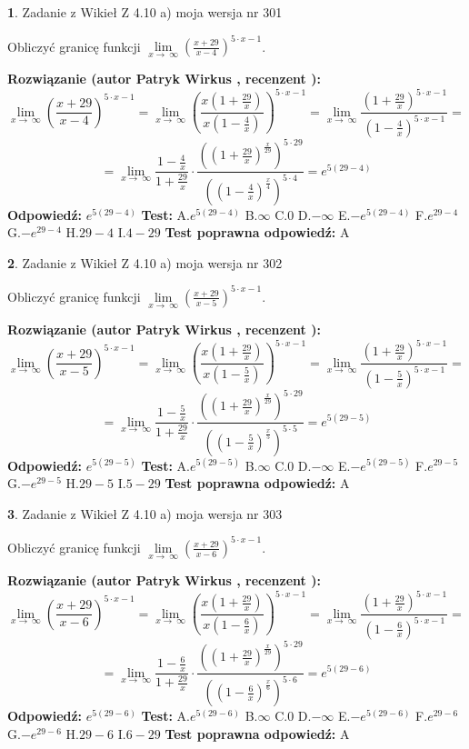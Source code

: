 \documentclass[12pt, a4paper]{article}
\theoremstyle{definition} %
\newtheorem{zad}{}
\newcommand{\zadStart}[1]{\begin{zad}#1\newline}
\newcommand{\zadStop}{\end{zad}}
\newcommand{\rozwStart}[2]{\noindent \textbf{Rozwiązanie (autor #1 , recenzent #2): }\newline}
\newcommand{\rozwStop}{\newline}
\newcommand{\odpStart}{\noindent \textbf{Odpowiedź:}\newline}
\newcommand{\odpStop}{\newline}
\newcommand{\testStart}{\noindent \textbf{Test:}\newline}
\newcommand{\testStop}{\newline}
\newcommand{\kluczStart}{\noindent \textbf{Test poprawna odpowiedź:}\newline}
\newcommand{\kluczStop}{\newline}
\begin{document}
\zadStart{Zadanie z Wikieł Z 4.10 a) moja wersja nr 301}


Obliczyć granicę funkcji  $\lim\limits_{x\to\ \infty}(\frac{x+29}{x-4})^{5\cdot x-1}$.
\zadStop
\rozwStart{Patryk Wirkus}{}
$$\lim\limits_{x\to\ \infty}(\frac{x+29}{x-4})^{5\cdot x-1} = \lim\limits_{x\to\ \infty}(\frac{x(1+\frac{29}{x})}{x(1-\frac{4}{x})})^{5\cdot x-1}=\lim\limits_{x\to\ \infty}\frac{(1+\frac{29}{x})^{5\cdot x-1}}{(1-\frac{4}{x})^{5\cdot x-1}}=$$
$$=\lim\limits_{x\to\ \infty}\frac{1-\frac{4}{x}}{1+\frac{29}{x}}\cdot\frac{((1+\frac{29}{x})^{\frac{x}{29}})^{5\cdot29}}{((1-\frac{4}{x})^{\frac{x}{4}})^{5\cdot4}}=e^{5(29-4)}$$
\rozwStop
\odpStart
$e^{5(29-4)}$
\odpStop
\testStart
A.$e^{5(29-4)}$ B.$\infty$ C.$0$ D.$-\infty$ E.$-e^{5(29-4)}$
F.$e^{29-4}$ G.$-e^{29-4}$
H.$29-4$
I.$4-29$
\testStop
\kluczStart
A
\kluczStop



\zadStart{Zadanie z Wikieł Z 4.10 a) moja wersja nr 302}


Obliczyć granicę funkcji  $\lim\limits_{x\to\ \infty}(\frac{x+29}{x-5})^{5\cdot x-1}$.
\zadStop
\rozwStart{Patryk Wirkus}{}
$$\lim\limits_{x\to\ \infty}(\frac{x+29}{x-5})^{5\cdot x-1} = \lim\limits_{x\to\ \infty}(\frac{x(1+\frac{29}{x})}{x(1-\frac{5}{x})})^{5\cdot x-1}=\lim\limits_{x\to\ \infty}\frac{(1+\frac{29}{x})^{5\cdot x-1}}{(1-\frac{5}{x})^{5\cdot x-1}}=$$
$$=\lim\limits_{x\to\ \infty}\frac{1-\frac{5}{x}}{1+\frac{29}{x}}\cdot\frac{((1+\frac{29}{x})^{\frac{x}{29}})^{5\cdot29}}{((1-\frac{5}{x})^{\frac{x}{5}})^{5\cdot5}}=e^{5(29-5)}$$
\rozwStop
\odpStart
$e^{5(29-5)}$
\odpStop
\testStart
A.$e^{5(29-5)}$ B.$\infty$ C.$0$ D.$-\infty$ E.$-e^{5(29-5)}$
F.$e^{29-5}$ G.$-e^{29-5}$
H.$29-5$
I.$5-29$
\testStop
\kluczStart
A
\kluczStop



\zadStart{Zadanie z Wikieł Z 4.10 a) moja wersja nr 303}


Obliczyć granicę funkcji  $\lim\limits_{x\to\ \infty}(\frac{x+29}{x-6})^{5\cdot x-1}$.
\zadStop
\rozwStart{Patryk Wirkus}{}
$$\lim\limits_{x\to\ \infty}(\frac{x+29}{x-6})^{5\cdot x-1} = \lim\limits_{x\to\ \infty}(\frac{x(1+\frac{29}{x})}{x(1-\frac{6}{x})})^{5\cdot x-1}=\lim\limits_{x\to\ \infty}\frac{(1+\frac{29}{x})^{5\cdot x-1}}{(1-\frac{6}{x})^{5\cdot x-1}}=$$
$$=\lim\limits_{x\to\ \infty}\frac{1-\frac{6}{x}}{1+\frac{29}{x}}\cdot\frac{((1+\frac{29}{x})^{\frac{x}{29}})^{5\cdot29}}{((1-\frac{6}{x})^{\frac{x}{6}})^{5\cdot6}}=e^{5(29-6)}$$
\rozwStop
\odpStart
$e^{5(29-6)}$
\odpStop
\testStart
A.$e^{5(29-6)}$ B.$\infty$ C.$0$ D.$-\infty$ E.$-e^{5(29-6)}$
F.$e^{29-6}$ G.$-e^{29-6}$
H.$29-6$
I.$6-29$
\testStop
\kluczStart
A
\kluczStop
\end{document}
